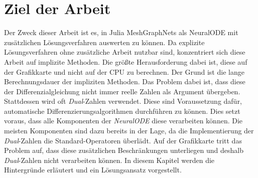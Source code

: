 
\section{Ziel der Arbeit} \label{sec:ziel_der_arbeit}

Der Zweck dieser Arbeit ist es, in Julia MeshGraphNets als NeuralODE mit zusätzlichen Lösungsverfahren auswerten zu können.
Da explizite Lösungsverfahren ohne zusätzliche Arbeit nutzbar sind,
konzentriert sich diese Arbeit auf implizite Methoden.
Die größte Herausforderung dabei ist, 
diese auf der Grafikkarte und nicht auf der CPU zu berechnen.
Der Grund ist die lange Berechnungsdauer der impliziten Methoden.
Das Problem dabei ist, dass diese der Differenzialgleichung nicht immer reelle Zahlen als Argument übergeben.
Stattdessen wird oft \textit{Dual}-Zahlen verwendet.
Diese sind Voraussetzung dafür, 
automatische Differenzierungsalgorithmen durchführen zu können.
Dies setzt voraus, dass alle Komponenten der \textit{NeuralODE}\cite{neuralode} diese verarbeiten können.
Die meisten Komponenten sind dazu bereits in der Lage, 
da die Implementierung der \textit{Dual}-Zahlen
die Standard-Operatoren überlädt.
Auf der Grafikkarte tritt das Problem auf, dass diese
zusätzlichen Beschränkungen unterliegen 
und deshalb \textit{Dual}-Zahlen nicht verarbeiten können.
In diesem Kapitel werden die Hintergründe erläutert und ein Lösungsansatz vorgestellt.

